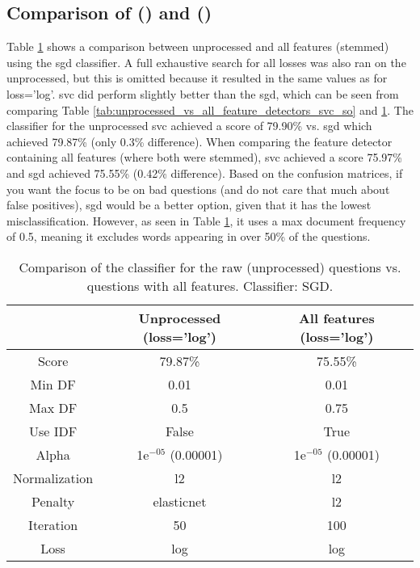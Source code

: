 \subsection[Comparison of SVC and SGD]{Comparison of  () and  ()}
\label{sec:comparing_svc_sgd}
Table \ref{tab:unprocessed_vs_all_feature_detectors_sgd_so} shows a comparison between unprocessed and all features (stemmed) using the \gls{sgd} classifier.
A full exhaustive search for all losses was also ran on the unprocessed, but this is omitted because it resulted in the same values as for loss='log'.
\vspace{0.5em}\newline
\gls{svc} did perform slightly better than the \gls{sgd}, which can be seen from comparing Table \ref{tab:unprocessed_vs_all_feature_detectors_svc_so} and \ref{tab:unprocessed_vs_all_feature_detectors_sgd_so}.
The classifier for the unprocessed \gls{svc} achieved a score of 79.90\% vs. \gls{sgd} which achieved 79.87\% (only 0.3\% difference).
When comparing the feature detector containing all features (where both were stemmed), \gls{svc} achieved a score 75.97\% and \gls{sgd} achieved 75.55\% (0.42\% difference). 
\vspace{0.5em}\newline	
Based on the confusion matrices, if you want the focus to be on bad questions (and do not care that much about false positives), \gls{sgd} would be a better option, given that it has the lowest misclassification.
However, as seen in Table \ref{tab:unprocessed_vs_all_feature_detectors_sgd_so}, it uses a max document frequency of 0.5, meaning it excludes words appearing in over 50\% of the questions.

\begin{table}[!h]%
	\centering
	\begin{tabular}{| c | c | c |}
		\hline
		~				& Unprocessed (loss='log')	& All features (loss='log')	\\ \hline
		Score 			& 79.87\%					& 75.55\%					\\ \hline
		Min DF 			& 0.01						& 0.01						\\ \hline
		Max DF 			& 0.5						& 0.75						\\ \hline
		Use IDF			& False						& True						\\ \hline
		Alpha 			& 1e$^{-05}$ (0.00001)		& 1e$^{-05}$ (0.00001)		\\ \hline
		Normalization 	& l2						& l2						\\ \hline		
		Penalty 		& elasticnet				& l2						\\ \hline
		Iteration 		& 50						& 100						\\ \hline
		Loss 			& log						& log						\\ \hline		
	\end{tabular}
	\caption{Comparison of the classifier for the raw (unprocessed) questions vs. questions with all features. Classifier: SGD.}
	\label{tab:unprocessed_vs_all_feature_detectors_sgd_so}
\end{table}


